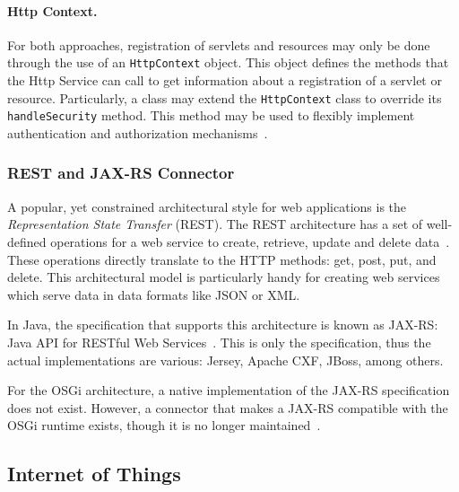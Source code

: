 \documentclass[12pt]{article}
\begin{document}
\paragraph{Http Context.} For both approaches, registration of servlets and resources may only be done through the use of an \texttt{HttpContext} object. This object defines the methods that the Http Service can call to get information about a registration of a servlet or resource.  Particularly, a class may extend the \texttt{HttpContext} class to override its \texttt{handleSecurity} method. This method may be used to flexibly implement authentication and authorization mechanisms~\cite{httpcontext}.

\subsubsection{REST and JAX-RS Connector}

A popular, yet constrained architectural style for web applications is the \emph{Representation State Transfer} (REST). The REST architecture has a set of well-defined operations for a web service to create, retrieve, update and delete data~\cite{rest_01}. These operations directly translate to the HTTP methods: get, post, put, and delete. This architectural model is particularly handy for creating web services which serve data in data formats like JSON or XML.

In Java, the specification that supports this architecture is known as JAX-RS: Java API for RESTful Web Services~\cite{rest_02}. This is only the specification, thus the actual implementations are various: Jersey, Apache CXF, JBoss, among others.

For the OSGi architecture, a native implementation of the JAX-RS specification does not exist. However, a connector that makes a JAX-RS compatible with the OSGi runtime exists, though it is no longer maintained~\cite{rest_03}.

\subsection{Internet of Things}
\end{document}
